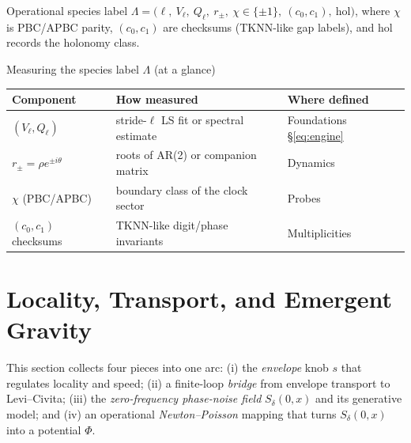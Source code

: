 \documentclass[11pt]{article}
\begin{document}
\begin{mydef}{Operational species label}
\(\Lambda=\big(\ell,\ V_\ell,\ Q_\ell,\ r_\pm,\ \chi\in\{\pm1\},\ (c_0,c_1),\ \mathrm{hol}\big)\),
where $\chi$ is PBC/APBC parity, $(c_0,c_1)$ are checksums (TKNN-like gap labels), and $\mathrm{hol}$ records the holonomy class.
\end{mydef}

\begin{mybox}{Measuring the species label $\Lambda$ (at a glance)}
\small
\begin{tabular}{@{}lll@{}}
\toprule
Component & How measured & Where defined \\ \midrule
$(V_\ell, Q_\ell)$ & stride-$\ell$ LS fit or spectral estimate & Foundations \S\ref{eq:engine} \\
$r_\pm=\rho e^{\pm i\theta}$ & roots of AR(2) or companion matrix & Dynamics \\
$\chi$ (PBC/APBC) & boundary class of the clock sector & Probes \\
$(c_0,c_1)$ checksums & TKNN-like digit/phase invariants & Multiplicities \\
\bottomrule
\end{tabular}
\end{mybox}


\section{Locality, Transport, and Emergent Gravity}
\label{sec:locality-transport-gravity}

This section collects four pieces into one arc: (i) the \emph{envelope} knob \(s\) that regulates
locality and speed; (ii) a finite-loop \emph{bridge} from envelope transport to Levi--Civita;
(iii) the \emph{zero-frequency phase-noise field} \(S_\delta(0,x)\) and its generative model; and
(iv) an operational \emph{Newton--Poisson} mapping that turns \(S_\delta(0,x)\) into a potential \(\Phi\).

\end{document}
